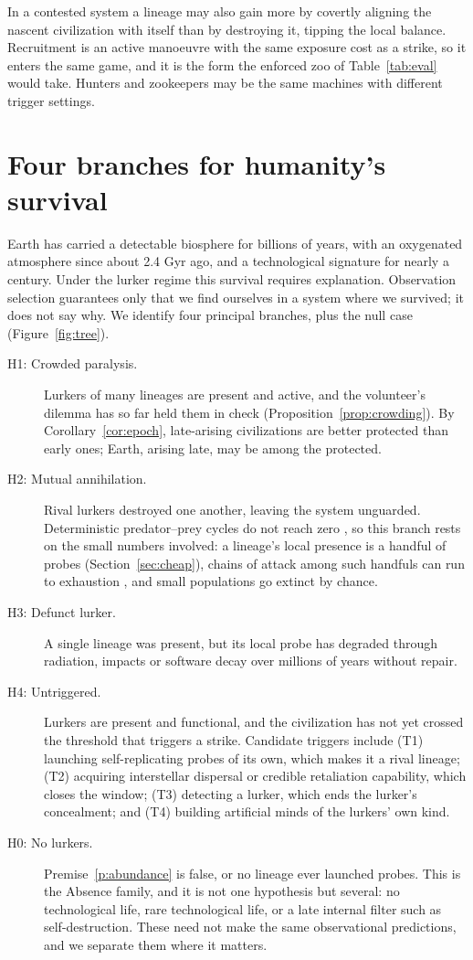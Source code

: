 \documentclass[preprint,12pt]{elsarticle}
\theoremstyle{definition}
\begin{document}
In a contested system a lineage may also gain more by covertly aligning the nascent civilization with itself than by destroying it, tipping the local balance. Recruitment is an active manoeuvre with the same exposure cost as a strike, so it enters the same game, and it is the form the enforced zoo of Table~\ref{tab:eval} would take. Hunters and zookeepers may be the same machines with different trigger settings.

\section{Four branches for humanity's survival}
\label{sec:branches}

Earth has carried a detectable biosphere for billions of years, with an oxygenated atmosphere since about 2.4 Gyr ago, and a technological signature for nearly a century. Under the lurker regime this survival requires explanation. Observation selection guarantees only that we find ourselves in a system where we survived; it does not say why. We identify four principal branches, plus the null case (Figure~\ref{fig:tree}).

\begin{description}
  \item[H1: Crowded paralysis.] Lurkers of many lineages are present and active, and the volunteer's dilemma has so far held them in check (Proposition~\ref{prop:crowding}). By Corollary~\ref{cor:epoch}, late-arising civilizations are better protected than early ones; Earth, arising late, may be among the protected.
  \item[H2: Mutual annihilation.] Rival lurkers destroyed one another, leaving the system unguarded. Deterministic predator--prey cycles do not reach zero \citep{Forgan2019}, so this branch rests on the small numbers involved: a lineage's local presence is a handful of probes (Section~\ref{sec:cheap}), chains of attack among such handfuls can run to exhaustion \citep{SandbergArmstrong2013}, and small populations go extinct by chance.
  \item[H3: Defunct lurker.] A single lineage was present, but its local probe has degraded through radiation, impacts or software decay over millions of years without repair.
  \item[H4: Untriggered.] Lurkers are present and functional, and the civilization has not yet crossed the threshold that triggers a strike. Candidate triggers include (T1) launching self-replicating probes of its own, which makes it a rival lineage; (T2) acquiring interstellar dispersal or credible retaliation capability, which closes the window; (T3) detecting a lurker, which ends the lurker's concealment; and (T4) building artificial minds of the lurkers' own kind.
  \item[H0: No lurkers.] Premise~\ref{p:abundance} is false, or no lineage ever launched probes. This is the Absence family, and it is not one hypothesis but several: no technological life, rare technological life, or a late internal filter such as self-destruction. These need not make the same observational predictions, and we separate them where it matters.
\end{description}
\end{document}
